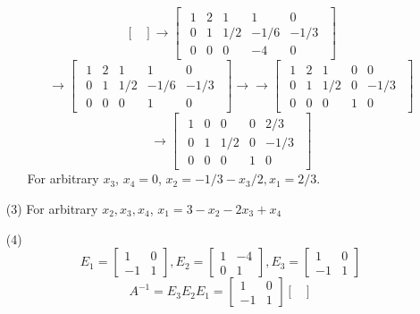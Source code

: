 \documentclass[12pt]{article}
\begin{document}
\begin{itemize}
\begin{itemize}
$$\begin{bmatrix}
\end{bmatrix} \rightarrow \begin{bmatrix}
\begin{array}{cccc|c}
1 & 2 & 1 & 1 & 0 \\
0 & 1 & 1/2 & -1/6 & -1/3 \\
0 & 0 & 0 & -4 & 0
\end{array}
\end{bmatrix}$$
$$\rightarrow \begin{bmatrix}
\begin{array}{cccc|c}
1 & 2 & 1 & 1 & 0 \\
0 & 1 & 1/2 & -1/6 & -1/3 \\
0 & 0 & 0 & 1 & 0
\end{array}
\end{bmatrix}\rightarrow\rightarrow \begin{bmatrix}
\begin{array}{cccc|c}
1 & 2 & 1 & 0 & 0 \\
0 & 1 & 1/2 & 0 & -1/3 \\
0 & 0 & 0 & 1 & 0
\end{array}
\end{bmatrix}$$
$$\rightarrow \begin{bmatrix}
\begin{array}{cccc|c}
1 & 0 & 0 & 0 & 2/3 \\
0 & 1 & 1/2 & 0 & -1/3 \\
0 & 0 & 0 & 1 & 0
\end{array}
\end{bmatrix}$$
For arbitrary $x_3$, $x_4 = 0$, $x_2 = -1/3 - x_3/2, x_1 = 2/3$.
\end{itemize}
\item[(3)]
For arbitrary $x_2, x_3, x_4$, $x_1 = 3 - x_2 - 2x_3 + x_4$
\item[(4)]
$$E_1 = \begin{bmatrix}
1 & 0 \\
-1 & 1
\end{bmatrix}, E_2 = \begin{bmatrix}
1 & -4 \\
0 & 1
\end{bmatrix}, E_3 = \begin{bmatrix}
1 & 0 \\
-1 & 1
\end{bmatrix}$$
$$A^{-1} = E_3E_2E_1 = \begin{bmatrix}
1 & 0 \\
-1 & 1
\end{bmatrix}\begin{bmatrix}

\end{bmatrix}$$
\end{itemize}
\end{document}
